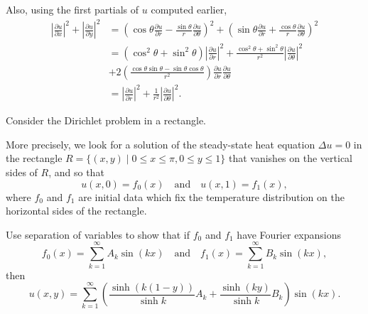 \documentclass[12 pt, letterpaper]{hmcpset}
\begin{document}
\begin{solution}
	Also, using the first partials of $u$ computed earlier,
	\begin{align*}
		\left \lvert \frac{\partial u}{\partial x} \right \rvert^{2} + \left \lvert \frac{\partial u}{\partial y} \right \rvert^{2} & = \left ( \cos{\theta} \frac{\partial u}{\partial r} - \frac{\sin{\theta}}{r} \frac{\partial u}{\partial \theta} \right )^{2} + \left ( \sin{\theta} \frac{\partial u}{\partial r} + \frac{\cos{\theta}}{r} \frac{\partial u}{\partial \theta} \right )^{2} \\
		& = (\cos^{2}{\theta} + \sin^{2}{\theta}) \left \lvert \frac{\partial u}{\partial r} \right \rvert^{2} + \frac{\cos^{2}{\theta} + \sin^{2}{\theta}}{r^{2}} \left \lvert \frac{\partial u}{\partial \theta} \right \rvert^{2} \\
		& + 2 \left ( \frac{\cos{\theta} \sin{\theta} - \sin{\theta} \cos{\theta}}{r^{2}} \right ) \frac{\partial u}{\partial r} \frac{\partial u}{\partial \theta} \\
		& = \left \lvert \frac{\partial u}{\partial r} \right \rvert^{2} + \frac{1}{r^{2}} \left \lvert \frac{\partial u}{\partial \theta} \right \rvert^{2}.
	\end{align*}
\end{solution}

\pagebreak

\begin{problem}[S \& S \S 1.5 \#1.]
	Consider the Dirichlet problem in a rectangle.

	More precisely, we look for a solution of the steady-state heat equation $\Delta u = 0$ in the rectangle $R = \{ (x, y) \mid 0 \le x \le \pi, 0 \le y \le 1 \}$ that vanishes on the vertical sides of $R$, and so that
	\[
		u(x, 0) = f_{0}(x) \quad \text{and} \quad u(x, 1) = f_{1}(x),
	\]
	where $f_{0}$ and $f_{1}$ are initial data which fix the temperature distribution on the horizontal sides of the rectangle.

	Use separation of variables to show that if $f_{0}$ and $f_{1}$ have Fourier expansions
	\[
		f_{0}(x) = \sum_{k = 1}^{\infty} A_{k} \sin{(k x)} \quad \text{and} \quad f_{1}(x) = \sum_{k = 1}^{\infty} B_{k} \sin{(k x)},
	\]
	then
	\[
		u(x, y) = \sum_{k = 1}^{\infty} \left ( \frac{\sinh{(k(1 - y))}}{\sinh{k}} A_{k} + \frac{\sinh{(k y)}}{\sinh{k}} B_{k} \right ) \sin{(k x)}.
	\]
\end{problem}
\end{document}
